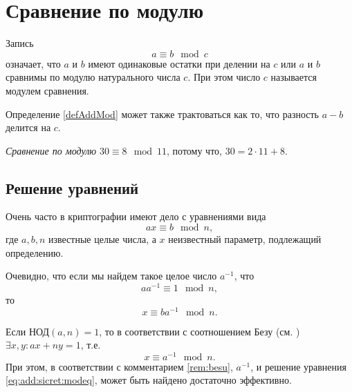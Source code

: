 \section{Сравнение по модулю}
\begin{definition}
Запись 
\begin{equation}
a \equiv b \mod{c}
\label{defAddMod}
\end{equation}
означает, что $a$ и $b$ имеют одинаковые остатки при делении на $c$
или $a$ и $b$ сравнимы по модулю натурального числа $c$. При этом
число $c$ называется модулем сравнения.
\end{definition}

Определение \ref{defAddMod} может также трактоваться как то, что
разность $a - b$ делится на $c$.

\begin{example}
\emph{Сравнение по модулю}
$30 \equiv 8 \mod{11}$, потому что, $30 = 2 \cdot 11 + 8$.
\end{example}

\subsection{Решение уравнений}
\label{sec:add:discretmath:mod:equationsolve}
Очень часто в криптографии имеют дело с уравнениями вида
\begin{equation}
a x \equiv b \mod n,
\label{eq:add:sicret:modeq}
\end{equation}
где $a, b, n$ известные целые числа, а $x$ неизвестный параметр,
подлежащий определению.

Очевидно, что если мы найдем такое целое число $a^{-1}$, что 
\[
a a^{-1} \equiv 1 \mod n,
\]
то
\[
x \equiv b a^{-1} \mod n.
\]

Если $\mbox{НОД}\left(a, n\right) = 1$, то в соответствии с
соотношением Безу (см. ) 
$\exists x, y: a x + n y = 1$, т.е. 
\[
x \equiv a^{-1} \mod n.
\]
При этом, в соответствии с комментарием \ref{rem:besu}, $a^{-1}$, и
решение уравнения \eqref{eq:add:sicret:modeq}, может быть найдено
достаточно эффективно.

